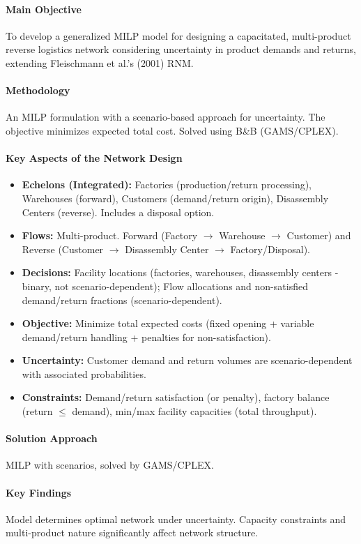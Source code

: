 \paragraph{Main Objective} To develop a generalized MILP model for designing a capacitated, multi-product reverse logistics network considering uncertainty in product demands and returns, extending Fleischmann et al.'s (2001) RNM.
\paragraph{Methodology} An MILP formulation with a scenario-based approach for uncertainty. The objective minimizes expected total cost. Solved using B\&B (GAMS/CPLEX).
\paragraph{Key Aspects of the Network Design}
\begin{itemize}
    \item \textbf{Echelons (Integrated):} Factories (production/return processing), Warehouses (forward), Customers (demand/return origin), Disassembly Centers (reverse). Includes a disposal option.
    \item \textbf{Flows:} Multi-product. Forward (Factory $\rightarrow$ Warehouse $\rightarrow$ Customer) and Reverse (Customer $\rightarrow$ Disassembly Center $\rightarrow$ Factory/Disposal).
    \item \textbf{Decisions:} Facility locations (factories, warehouses, disassembly centers - binary, not scenario-dependent); Flow allocations and non-satisfied demand/return fractions (scenario-dependent).
    \item \textbf{Objective:} Minimize total expected costs (fixed opening + variable demand/return handling + penalties for non-satisfaction).
    \item \textbf{Uncertainty:} Customer demand and return volumes are scenario-dependent with associated probabilities.
    \item \textbf{Constraints:} Demand/return satisfaction (or penalty), factory balance (return $\le$ demand), min/max facility capacities (total throughput).
\end{itemize}
\paragraph{Solution Approach} MILP with scenarios, solved by GAMS/CPLEX.
\paragraph{Key Findings} Model determines optimal network under uncertainty. Capacity constraints and multi-product nature significantly affect network structure.
